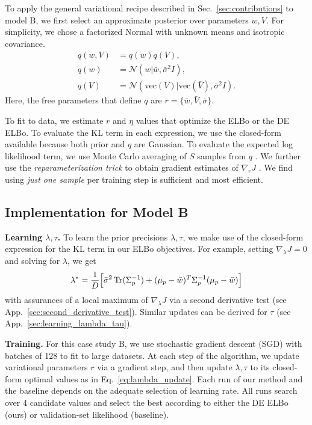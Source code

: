 To apply the general variational recipe described in Sec.~\ref{sec:contributions} to model B, we first select an approximate posterior over parameters $w, V$. For simplicity, we chose a factorized Normal with unknown means and isotropic covariance.
\begin{align}
    q(w, V) &= q(w)q(V), \\
    q(w) &= \mathcal{N}( w | \bar{w}, \bar{\sigma}^2 I), \\
    q(V) &= \mathcal{N}( \text{vec}(V) | \text{vec}(\bar{V}), \bar{\sigma}^2 I).
\end{align}
Here, the free parameters that define $q$ are $r = \{\bar{w}, \bar{V}, \bar{\sigma} \}$. 

To fit to data, we estimate $r$ and $\eta$ values that optimize the ELBo or the DE ELBo. To evaluate the KL term in each expression, we use the closed-form available because both prior and $q$ are Gaussian. To evaluate the expected log likelihood term, we use Monte Carlo averaging of $S$ samples from $q$ \citep{xu2019variance,mohamed2020monte}. We further use the \emph{reparameterization trick} to obtain gradient estimates of $\nabla_r J$ \citep{blundell2015weight}.
We find using \emph{just one sample} per training step is sufficient and most efficient.




\subsection{Implementation for Model B}

\textbf{Learning $\lambda,\tau$.}
To learn the prior precisions $\lambda, \tau$, we make use of the closed-form expression for the KL term in our ELBo objectives.
For example, setting $\nabla_\lambda J = 0$ and solving for $\lambda$, we get 
\begin{align}
    \lambda^* = \frac{1}{D} \Big[ \bar{\sigma}^2 \operatorname{Tr}(\Sigma_p^{-1}) + (\mu_p-\bar{w})^T \Sigma_p^{-1} (\mu_p-\bar{w}) \Big]
    \label{eq:lambda_update}
\end{align}
with assurances of a local maximum of $\nabla_\lambda J$ via a second derivative test (see App.~\ref{sec:second_derivative_test}). Similar updates can be derived for $\tau$ (see App.~\ref{sec:learning_lambda_tau}).

\textbf{Training.}
For this case study B, we use stochastic gradient descent (SGD) with batches of 128 to fit to large datasets.
At each step of the algorithm, we update variational parameters $r$ via a gradient step, and then update $\lambda, \tau$ to its closed-form optimal values as in Eq.~\eqref{eq:lambda_update}.
Each run of our method and the baseline depends on the adequate selection of learning rate. All runs search over 4 candidate values and select the best according to either the DE ELBo (ours) or validation-set likelihood (baseline).

